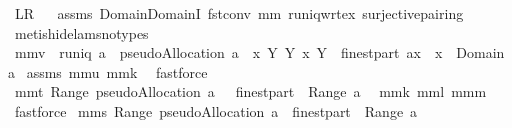 \begin{isabellebody}
{\isacharparenleft}\ {\isachardoublequoteopen}{\isacharquery}L{\isacharequal}{\isacharquery}R{\isachardoublequoteclose}{\isacharparenright}%
\isadelimproof
\ %
\endisadelimproof
%
\isatagproof
{}\isamarkupfalse%
\ assms\ Domain{\isachardot}DomainI\ fst{\isacharunderscore}conv\ mm{}{}\ runiq{\isacharunderscore}wrt{\isacharunderscore}ex{}\ surjective{\isacharunderscore}pairing\isanewline
{}\isamarkupfalse%
\ {\isacharparenleft}metis{\isacharparenleft}hide{\isacharunderscore}lams{\isacharcomma}no{\isacharunderscore}types{\isacharparenright}{\isacharparenright}%
\endisatagproof
{\isafoldproof}%
%
\isadelimproof
%
\endisadelimproof
\isanewline
\isanewline
{}\isamarkupfalse%
\ mm{}{}v{\isacharcolon}\ \ {\isachardoublequoteopen}runiq\ a{\isachardoublequoteclose}\ \ {\isachardoublequoteopen}pseudoAllocation\ a\ {\isacharequal}\ {\isacharbraceleft}{\isacharparenleft}x{\isacharcomma}\ Y{\isacharparenright}{\isacharbar}\ Y\ x{\isachardot}\ Y\ {\isasymin}\ finestpart\ {\isacharparenleft}a{\isacharcomma}{\isacharcomma}x{\isacharparenright}\ {\isacharampersand}\ x\ {\isasymin}\ Domain\ a{\isacharbraceright}{\isachardoublequoteclose}\isanewline
%
\isadelimproof
%
\endisadelimproof
%
\isatagproof
{}\isamarkupfalse%
\ assms\ mm{}{}u\ mm{}{}k\ \isamarkupfalse%
\ fastforce%
\endisatagproof
{\isafoldproof}%
%
\isadelimproof
\isanewline
%
\endisadelimproof
\isanewline
{}\isamarkupfalse%
\ mm{}{}t{\isacharcolon}\ {\isachardoublequoteopen}Range\ {\isacharparenleft}pseudoAllocation\ a{\isacharparenright}\ {\isacharequal}\ {\isasymUnion}\ {\isacharparenleft}finestpart\ {\isacharbackquote}\ {\isacharparenleft}Range\ a{\isacharparenright}{\isacharparenright}{\isachardoublequoteclose}\ \isanewline
%
\isadelimproof
%
\endisadelimproof
%
\isatagproof
{}\isamarkupfalse%
\ mm{}{}k\ mm{}{}l\ mm{}{}m\ \isamarkupfalse%
\ fastforce%
\endisatagproof
{\isafoldproof}%
%
\isadelimproof
\isanewline
%
\endisadelimproof
\isanewline
{}\isamarkupfalse%
\ mm{}{}s{\isacharcolon}\ {\isachardoublequoteopen}Range\ {\isacharparenleft}pseudoAllocation\ a{\isacharparenright}\ {\isacharequal}\ finestpart\ {\isacharparenleft}{\isasymUnion}\ Range\ a{\isacharparenright}{\isachardoublequoteclose}%

\end{isabellebody}
